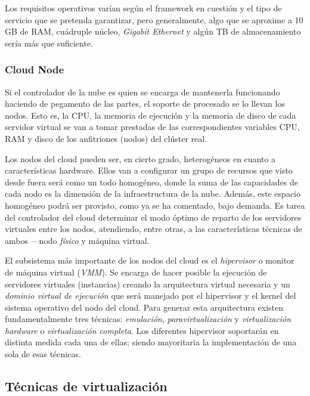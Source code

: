 Los requisitos operativos var\'ian seg\'un el framework en cuesti\'on y el tipo de servicio que se pretenda garantizar, pero generalmente, algo que se a\-pro\-xi\-me a 10 GB de RAM, cu\'adruple n\'ucleo,  \emph{Gigabit Ethernet} y alg\'un TB de almacenamiento ser\'ia m\'as que suficiente.


\subsubsection{Cloud Node}\label{subsubsec:cloudnode}

\noindent Si el controlador de la nube es quien se encarga de mantenerla funcionando haciendo de pegamento de las partes, el soporte de procesado se lo llevan los nodos. Esto es, la CPU, la memoria de ejecuci\'on y la memoria de disco de cada servidor virtual se van a tomar prestadas de las correspondientes variables CPU, RAM y disco de los anfitriones (nodos) del cl\'uster real.\newline

Los nodos del cloud pueden ser, en cierto grado, heterog\'eneos en cuanto a caracter\'isticas hardware. Ellos van a configurar un grupo de recursos que visto desde fuera ser\'a como un todo homog\'eneo, donde la suma de las capacidades de cada nodo es la dimensi\'on de la infraestructura de la nube. Adem\'as, este espacio homog\'eneo podr\'a ser provisto, como ya se ha comentado, bajo demanda. Es tarea del controlador del cloud determinar el modo \'optimo de reparto de los servidores virtuales entre los nodos, atendiendo, entre otras, a las caracter\'isticas t\'ecnicas de ambos ---nodo \emph{f\'isico} y m\'aquina virtual.\newline

El subsistema m\'as importante de los nodos del cloud es el \emph{hipervisor} o monitor de m\'aquina virtual (\emph{VMM}). Se encarga de hacer posible la ejecuci\'on de servidores virtuales (instancias) creando la arquitectura virtual necesaria y un \emph{dominio virtual de ejecuci\'on} que ser\'a manejado por el hipervisor y el kernel del sistema operativo del nodo del cloud. Para generar esta arquitectura existen fundamentalmente tres t\'ecnicas: \emph{emulaci\'on}, \emph{paravirtualizaci\'on} y \emph{virtualizaci\'on hardware} o \emph{virtualizaci\'on completa}. Los diferentes hipervisor soportar\'an en distinta medida cada una de ellas; siendo mayoritaria la implementaci\'on de una sola de esas t\'ecnicas.\newline

\subsection{T\'ecnicas de virtualizaci\'on}\label{subsec:tecnicasemu}

